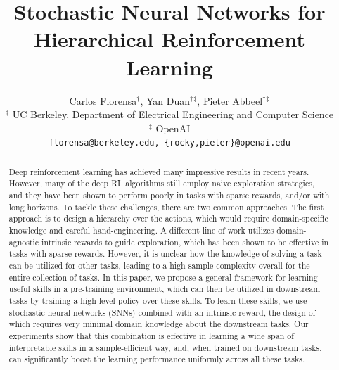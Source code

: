 \documentclass{article} %
\title{Stochastic Neural Networks for \\Hierarchical Reinforcement Learning}
\author{Carlos Florensa${^\dagger}$, Yan Duan${^\dagger}{^\ddagger}$, Pieter Abbeel${^\dagger}{^\ddagger}$ \\
$^\dagger$ UC Berkeley, Department of Electrical Engineering and Computer Science\\
$^\ddagger$ OpenAI\\
\texttt{florensa@berkeley.edu, \{rocky,pieter\}@openai.edu}
}
\begin{document}
	
	\maketitle

\begin{abstract}








Deep reinforcement learning has achieved many impressive results in recent years. However, many of the deep RL algorithms still employ naive exploration strategies, and they have been shown to perform poorly in tasks with sparse rewards, and/or with long horizons. To tackle these challenges, there are two common approaches. The first approach is to design a hierarchy over the actions, which would require domain-specific knowledge and careful hand-engineering. A different line of work utilizes domain-agnostic intrinsic rewards to guide exploration, which has been shown to be effective in tasks with sparse rewards. However, it is unclear how the knowledge of solving a task can be utilized for other tasks, leading to a high sample complexity overall for the entire collection of tasks. In this paper, we propose a general framework for learning useful skills in a pre-training environment, which can then be utilized in downstream tasks by training a high-level policy over these skills. To learn these skills, we use stochastic neural networks (SNNs) combined with an intrinsic reward, the design of which requires very minimal domain knowledge about the downstream tasks. Our experiments show that this combination is effective in learning a wide span of interpretable skills in a sample-efficient way, and, when trained on downstream tasks, can significantly boost the learning performance uniformly across all these tasks. 


\end{abstract}
\end{document}
